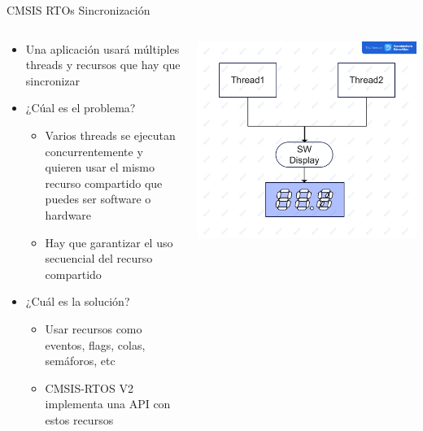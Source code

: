 \begin{frame}{CMSIS RTOs Sincronización}
    \begin{columns}
        \begin{column}{0.50\textwidth}
            \begin{itemize}
                \item Una aplicación usará múltiples threads y recursos que hay que sincronizar
                \item ¿Cúal es el problema?
                    \begin{itemize}
                        \item Varios threads se ejecutan concurrentemente y quieren usar el mismo recurso compartido que puedes ser software o hardware
                        \item Hay que garantizar el uso secuencial del recurso compartido
                    \end{itemize}
                \item ¿Cuál es la solución?
                \begin{itemize}
                    \item Usar recursos como eventos, flags, colas, semáforos, etc
                    \item CMSIS-RTOS V2 implementa una API con estos recursos
                \end{itemize}
            \end{itemize}    
        \end{column}
        \begin{column}{0.50\textwidth}
            \includegraphics[scale=0.05]{presentation/threads.jpg}
        \end{column}
    \end{columns}
\end{frame}
